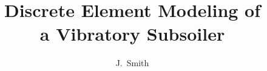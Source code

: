 \documentclass[14pt,a4paper, afrikaans,english,masters-t,goldenblock]{stb-thesis-x}
\title{\bfseries Discrete Element Modeling of\\ a Vibratory Subsoiler}
\author{J.\ Smith}{John Smith}
\begin{document}
\frontmatter
\TitlePage
\end{document}
